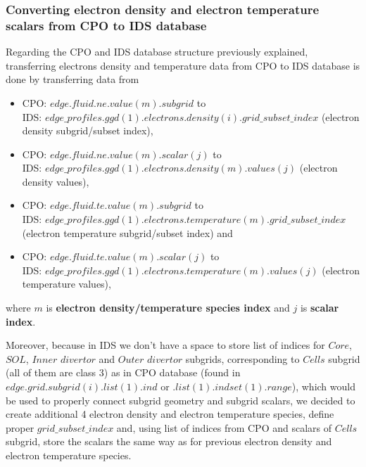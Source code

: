 \documentclass[a4paper,12pt,twoside]{article}
\begin{document}
\subsubsection{Converting electron density and electron temperature scalars from CPO to IDS database}

Regarding the CPO and IDS database structure previously explained, transferring electrons density and temperature data from CPO to IDS database is done by transferring data from

\begin{itemize}
\item CPO: $ edge.fluid.ne.value(m).subgrid$ to \\
IDS: $edge\_profiles.ggd(1).electrons.density(i).grid\_subset\_index $ (electron density subgrid/subset index), \\

\item CPO: $ edge.fluid.ne.value(m).scalar(j)$ to \\
IDS:  $edge\_profiles.ggd(1).electrons.density(m).values(j)$ (electron density values), \\

\item CPO: $edge.fluid.te.value(m).subgrid$  to \\  IDS: $edge\_profiles.ggd(1).electrons.temperature(m).grid\_subset\_index$ (electron temperature subgrid/subset index) and \\

\item CPO: $ edge.fluid.te.value(m).scalar(j)$  to \\
IDS: $edge\_profiles.ggd(1).electrons.temperature(m).values(j)$ (electron temperature values),
\end{itemize}
where $m$ is \textbf{electron density/temperature species index} and $j$ is \textbf{scalar index}.

Moreover, because in IDS we don't have a space to store list of indices for $Core$, $SOL$, $Inner$ $divertor$ and $Outer$ $divertor$ subgrids, corresponding to $Cells$ subgrid (all of them are class 3) as in CPO database (found in $edge.grid.subgrid(i).list(1).ind$ or $.list(1).indset(1).range$), which would be used to properly connect subgrid geometry and subgrid scalars, we decided to create additional 4 electron density and electron temperature species, define proper $grid\_subset\_index$ and, using list of indices from CPO and scalars of $Cells$ subgrid, store the scalars the same way as for previous electron density and electron temperature species.
\end{document}
